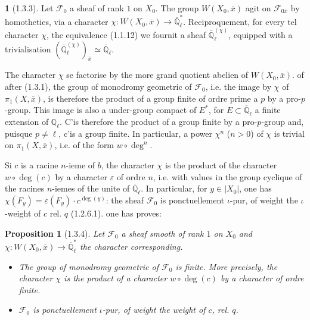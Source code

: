 \documentclass[12pt,a4paper]{article}
\theoremstyle{plain}
\newtheorem{proposition}[theorem]{Proposition}
\theoremstyle{definition}
\theoremstyle{definition}
\newtheorem{para}{}[section]
\theoremstyle{remark}
\begin{document}
\begin{para}[1.3.3]
Let $\mathscr{F}_0$ a sheaf of rank $1$ on $X_0$. The group $W(X_0, \overline{x})$ agit on $\mathscr{F}_{0\overline{x}}$ by homotheties, via a character $\chi : W(X_0, \overline{x}) \to \overline{\mathbb{Q}}_\ell^*$. Reciproquement, for every tel character $\chi$, the equivalence (1.1.12) we fournit a sheaf $\overline{\mathbb{Q}}_\ell^{(\chi)}$, equipped with a trivialisation $(\overline{\mathbb{Q}}_\ell^{(\chi)})_{\overline{x}} \simeq \overline{\mathbb{Q}}_\ell$.

The character $\chi$ se factorise by the more grand quotient abelien of $W(X_0, \overline{x})$. of after (1.3.1), the group of monodromy geometric of $\mathscr{F}_0$, i.e. the image by $\chi$ of $\pi_1(X, \overline{x})$, is therefore the product of a group finite of ordre prime a $p$ by a pro-$p$-group. This image is also a under-group compact of $E^*$, for $E \subset \overline{\mathbb{Q}}_\ell$ a finite extension of $\mathbb{Q}_\ell$. C'is therefore the product of a group finite by a pro-$p$-group and, puisque $p \neq \ell$, c'is a group finite. In particular, a power $\chi^n$ ($n > 0$) of $\chi$ is trivial on $\pi_1(X, \overline{x})$, i.e. of the form $w \circ \deg^n$.

Si $c$ is a racine $n$-ieme of $b$, the character $\chi$ is the product of the character $w \circ \deg(c)$ by a character $\varepsilon$ of ordre $n$, i.e. with values in the group cyclique of the racines $n$-iemes of the unite of $\overline{\mathbb{Q}}_\ell$. In particular, for $y \in |X_0|$, one has $\chi(F_y) = \varepsilon(F_y) \cdot c^{\deg(y)}$: the sheaf $\mathscr{F}_0$ is ponctuellement $\iota$-pur, of weight the $\iota$-weight of $c$ rel. $q$ (1.2.6.1). one has proves:
\end{para}

\begin{proposition}[1.3.4]
Let $\mathscr{F}_0$ a sheaf smooth of rank $1$ on $X_0$ and $\chi : W(X_0, \overline{x}) \to \overline{\mathbb{Q}}_\ell^*$ the character corresponding.
\begin{itemize}[nosep]
\item[(i)] The group of monodromy geometric of $\mathscr{F}_0$ is finite. More precisely, the character $\chi$ is the product of a character $w \circ \deg(c)$ by a character of ordre finite.
\item[(ii)] $\mathscr{F}_0$ is ponctuellement $\iota$-pur, of weight the weight of $c$, rel. $q$.
\end{itemize}
\end{proposition}
\end{document}
